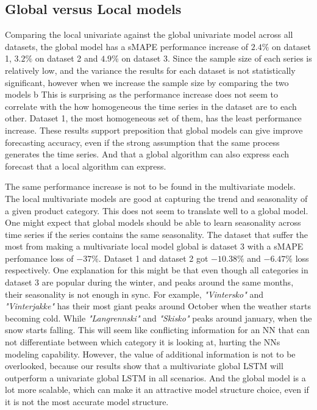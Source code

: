 

\subsection{Global versus Local models}
Comparing the local univariate against the global univariate model across all datasets,
the global model has a sMAPE performance increase of $2.4\%$ on dataset 1, $3.2\%$ on dataset 2 and
$4.9\%$ on dataset 3. Since the sample size of each series is relatively low, and the variance
the results for each dataset is not statistically significant, however when we
increase the sample size by comparing the two models b This is surprising as the performance increase does not seem to correlate
with the how homogeneous the time series in the dataset are to each other.
Dataset 1, the most homogeneous set of them, has the least performance increase.
These results support \cite{Montero-Manso2021} preposition that global models can give
improve forecasting accuracy, even if the strong assumption that the same process generates the time series.
And that a global algorithm can also express each forecast that a local algorithm can express.

The same performance increase is not to be found in the multivariate models.
The local multivariate models are good at capturing the trend and seasonality of
a given product category. This does not seem to translate well to a global model.
One might expect that global models should be able to learn seasonality across
time series if the series contains the same seasonality.
The dataset that suffer the most from making a multivariate local model global is dataset 3
with a sMAPE perfomance loss of $-37\%$. Dataset 1 and dataset 2 got $-10.38\%$ and $-6.47\%$ loss
respectively.
One explanation for this might be that even though all categories in dataset 3 are popular during the
winter, and peaks around the same months, their seasonality is not enough in sync.
For example, \textit{"Vintersko"} and \textit{"Vinterjakke"} has their most giant peaks around October
when the weather starts becoming cold. While \textit{"Langrennski"} and \textit{"Skisko"}
peaks around january, when the snow starts falling.
This will seem like conflicting information for an NN that can not differentiate between
which category it is looking at, hurting the NNs modeling capability.
However, the value of additional information is not to be overlooked,
because our results show that a multivariate global LSTM will outperform
a univariate global LSTM in all scenarios.
And the global model is a lot more scalable, which can make
it an attractive model structure choice, even if it is not the most
accurate model structure.


